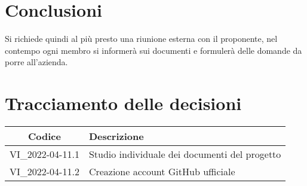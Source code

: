 \section{Conclusioni}
Si richiede quindi al più presto una riunione esterna con il proponente,
nel contempo ogni membro si informerà sui documenti e formulerà delle domande da porre all'azienda.

\newpage

\section*{Tracciamento delle decisioni}
	\renewcommand{\arraystretch}{1.8} %
	\begin{tabular}{ |c|l| }
		\hline
		\textbf{Codice} & \textbf{Descrizione} \\
		\hline
		VI\_2022-04-11.1 & Studio individuale dei documenti del progetto \\ %
		\hline
		VI\_2022-04-11.2 & Creazione account GitHub ufficiale \\
		\hline
	\end{tabular}
